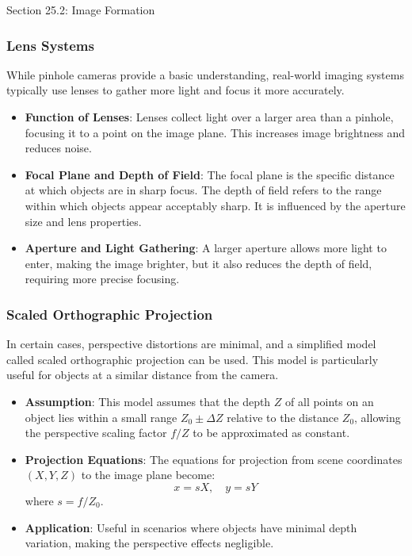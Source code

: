 \begin{notes}{Section 25.2: Image Formation}
    \subsubsection*{Lens Systems}
    
    While pinhole cameras provide a basic understanding, real-world imaging systems typically use lenses to gather more light and focus it more accurately.
    
    \begin{highlight}
    
        \begin{itemize}
            \item \textbf{Function of Lenses}: Lenses collect light over a larger area than a pinhole, focusing it to a point on the image plane. This increases image brightness and reduces noise.
            \item \textbf{Focal Plane and Depth of Field}: The focal plane is the specific distance at which objects are in sharp focus. The depth of field refers to the range within which objects appear 
            acceptably sharp. It is influenced by the aperture size and lens properties.
            \item \textbf{Aperture and Light Gathering}: A larger aperture allows more light to enter, making the image brighter, but it also reduces the depth of field, requiring more precise focusing.
        \end{itemize}
    
    \end{highlight}
    
    \subsubsection*{Scaled Orthographic Projection}
    
    In certain cases, perspective distortions are minimal, and a simplified model called scaled orthographic projection can be used. This model is particularly useful for objects at a similar distance from 
    the camera.
    
    \begin{highlight}
    
        \begin{itemize}
            \item \textbf{Assumption}: This model assumes that the depth \( Z \) of all points on an object lies within a small range \( Z_0 \pm \Delta Z \) relative to the distance \( Z_0 \), allowing the perspective 
            scaling factor \( f/Z \) to be approximated as constant.
            \item \textbf{Projection Equations}: The equations for projection from scene coordinates \((X, Y, Z)\) to the image plane become:
            \[
            x = sX, \quad y = sY
            \]
            where \( s = f/Z_0 \).
            \item \textbf{Application}: Useful in scenarios where objects have minimal depth variation, making the perspective effects negligible.
        \end{itemize}
    

\end{highlight}
\end{notes}
